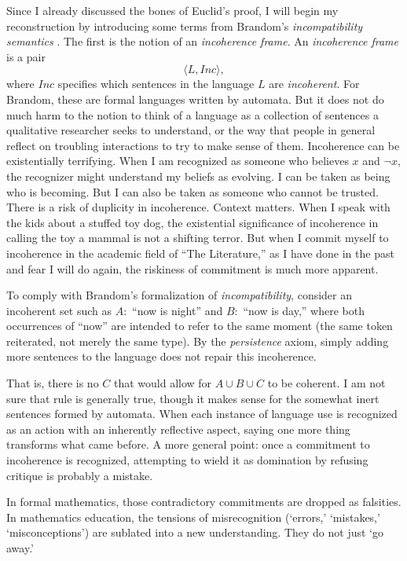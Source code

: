 \documentclass[12pt]{book}
\begin{document}
Since I already discussed the bones of Euclid's proof, I will begin my reconstruction by introducing some terms from Brandom's \textit{incompatibility semantics} \parencite{Brandom2008}. The first is the notion of an \textit{incoherence frame}. An \textit{incoherence frame} is a pair 
\[
\langle L, Inc \rangle,
\]
where $Inc$ specifies which sentences in the language $L$ are \textit{incoherent}. For Brandom, these are formal languages written by automata. But it does not do much harm to the notion to think of a language as a collection of sentences a qualitative researcher seeks to understand, or the way that people in general reflect on troubling interactions to try to make sense of them. Incoherence can be existentially terrifying. When I am recognized as someone who believes $x$ and $\neg x$, the recognizer might understand my beliefs as evolving.  I can be taken as being who is becoming. But I can also be taken as someone who cannot be trusted. There is a risk of duplicity in incoherence. Context matters. When I speak with the kids about a stuffed toy dog, the existential significance of incoherence in calling the toy a mammal is not a shifting terror. But when I commit myself to incoherence in the academic field of ``The Literature,'' as I have done in the past and fear I will do again, the riskiness of commitment is much more apparent. 


To comply with Brandom's formalization of \textit{incompatibility}, consider an incoherent set such as $A:$ ``now is night'' and $B:$ ``now is day,'' where both occurrences of ``now'' are intended to refer to the same moment (the same token reiterated, not merely the same type). By the \textit{persistence} axiom, simply adding more sentences to the language does not repair this incoherence.

That is, there is no $C$ that would allow for $A\cup B \cup C$ to be coherent. I am not sure that rule is generally true, though it makes sense for the somewhat inert sentences formed by automata. When each instance of language use is recognized as an action with an inherently reflective aspect, saying one more thing transforms what came before.
A more general point: once a commitment to incoherence is recognized, attempting to wield it as domination by refusing critique is probably a mistake.


In formal mathematics, those contradictory commitments are dropped as falsities. In mathematics education, the tensions of misrecognition (`errors,' `mistakes,' `misconceptions') are sublated into a new understanding. They do not just `go away.'
\end{document}

